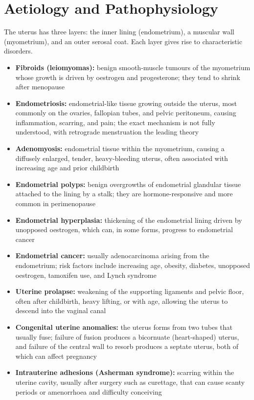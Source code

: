 \section*{Aetiology and Pathophysiology}
The uterus has three layers: the inner lining (endometrium), a muscular wall (myometrium), and an outer serosal coat. Each layer gives rise to characteristic disorders.

\begin{itemize}
    \item \textbf{Fibroids (leiomyomas):} benign smooth-muscle tumours of the myometrium whose growth is driven by oestrogen and progesterone; they tend to shrink after menopause
    \item \textbf{Endometriosis:} endometrial-like tissue growing outside the uterus, most commonly on the ovaries, fallopian tubes, and pelvic peritoneum, causing inflammation, scarring, and pain; the exact mechanism is not fully understood, with retrograde menstruation the leading theory
    \item \textbf{Adenomyosis:} endometrial tissue within the myometrium, causing a diffusely enlarged, tender, heavy-bleeding uterus, often associated with increasing age and prior childbirth
    \item \textbf{Endometrial polyps:} benign overgrowths of endometrial glandular tissue attached to the lining by a stalk; they are hormone-responsive and more common in perimenopause
    \item \textbf{Endometrial hyperplasia:} thickening of the endometrial lining driven by unopposed oestrogen, which can, in some forms, progress to endometrial cancer
    \item \textbf{Endometrial cancer:} usually adenocarcinoma arising from the endometrium; risk factors include increasing age, obesity, diabetes, unopposed oestrogen, tamoxifen use, and Lynch syndrome
    \item \textbf{Uterine prolapse:} weakening of the supporting ligaments and pelvic floor, often after childbirth, heavy lifting, or with age, allowing the uterus to descend into the vaginal canal
    \item \textbf{Congenital uterine anomalies:} the uterus forms from two tubes that usually fuse; failure of fusion produces a bicornuate (heart-shaped) uterus, and failure of the central wall to resorb produces a septate uterus, both of which can affect pregnancy
    \item \textbf{Intrauterine adhesions (Asherman syndrome):} scarring within the uterine cavity, usually after surgery such as curettage, that can cause scanty periods or amenorrhoea and difficulty conceiving
\end{itemize}

